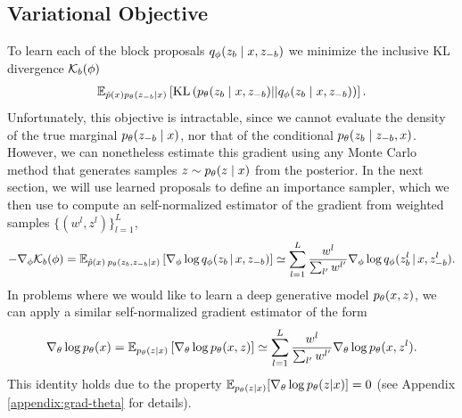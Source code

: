 \documentclass[anonymous=false, %
               format=acmsmall, %
               review=true, %
               screen=true, %
               nonacm=true]{acmart}
\theoremstyle{definition}
\begin{document}
\subsection{Variational Objective} 
To learn each of the block proposals $q_\phi(z_b \mid x, z_{-b})$ we minimize the inclusive KL divergence $\mathcal{K}_b(\phi)$
\begin{align}
    \mathbb{E}_{\hat{p}(x)p_\theta(z_{-b} | x)}
    \left[
    \text{KL}\left(
        p_\theta(z_{b} \mid x, z_{-b})
        ||
        q_\phi(z_{b} \mid x, z_{-b})
    \right)
    \right]. \label{eq:variational_objective}
\end{align}
Unfortunately, this objective is intractable, since we cannot evaluate the density of the true marginal $p_\theta(z_{-b} \mid x)$, nor that of the conditional $p_\theta(z_{b} \mid z_{-b}, x)$. 
However, we can nonetheless estimate this gradient using any Monte Carlo method that generates samples $z \sim p_\theta(z \mid x)$ from the posterior. In the next section, we will use learned proposals to define an importance sampler, which we then use to compute an self-normalized estimator of the gradient from weighted samples $\{(w^l, z^l)\}_{l=1}^L$, 
\begin{align}
    \label{eq:grad-self-normalized}
    -\nabla_\phi \mathcal{K}_b(\phi)
    =
    \mathbb{E}_{
    \hat{p}(x) \:
    p_\theta(z_{b}, z_{-b} | x)
    }
    \left[
    \nabla_\phi
    \log q_\phi(z_{b} \,|\, x, z_{-b})
    \right]
    \simeq
    \sum_{l=1}^L
    \frac{w^l}{\sum_{l'} w^{l'}}
    \nabla_\phi
    \log q_\phi(z^l_{b} \,|\, x, z^l_{-b})
    .
\end{align}
In problems where we would like to learn a deep generative model $p_\theta(x, z)$, we can apply a similar self-normalized gradient estimator of the form
\begin{align}
    \label{eq:grad-theta}
    \nabla_\theta \log p_\theta(x) 
    =
    \mathbb{E}_{p_\theta(z | x)} 
    \left[
    \nabla_\theta \log p_\theta(x, z)
    \right]
    \simeq
    \sum_{l=1}^L
    \frac{w^l}{\sum_{l'} w^{l'}}
    \nabla_\theta
    \log p_\theta(x, z^l)
    .
\end{align}
This identity holds due to the property $\mathbb{E}_{p_\theta(z|x)}[\nabla_\theta \log p_\theta(z|x)]=0$ (see Appendix \ref{appendix:grad-theta} for details). 
\end{document}
